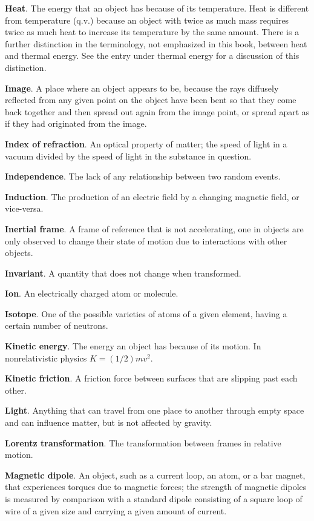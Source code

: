 \textbf{Heat}. The energy that an object has because of its temperature. Heat is different from temperature
(q.v.) because
an object with twice as much mass requires twice as much heat to increase its temperature by the same
amount. There is a
further distinction in the terminology, not emphasized in this book, between heat and thermal energy. See
the entry
under thermal energy for a discussion of this distinction. 

\textbf{Image}. A place where an object appears to be, because the rays diffusely reflected from any given
point on the object have been bent so that they come back together and then spread out again from the image
point, or spread apart as if they had originated from the image. 

\textbf{Index of refraction}. An optical property of matter; the speed of light in a vacuum divided by the
speed of light in the substance in question. 

\textbf{Independence}. The lack of any relationship between two random events.

\textbf{Induction}. The production of an electric field by a changing magnetic field, or vice-versa. 

\textbf{Inertial frame}. A frame of reference that is not accelerating, one in objects are only observed
to change their state of motion due to interactions with other objects.


\textbf{Invariant}. A quantity that does not change when transformed.

\textbf{Ion}. An electrically charged atom or molecule. 

\textbf{Isotope}. One of the possible varieties of atoms of a given element, having a certain number of
neutrons. 

\textbf{Kinetic energy}. The energy an object has because of its motion. In nonrelativistic
physics $K=(1/2)mv^2$.

\textbf{Kinetic friction}. A friction force between surfaces that are slipping past each other.

\textbf{Light}. Anything that can travel from one place to another through empty space and can influence
matter, but is
not affected by gravity. 

\textbf{Lorentz transformation}. The transformation between frames in relative motion.

\textbf{Magnetic dipole}. An object, such as a current loop, an atom, or a bar magnet, that experiences
torques due to magnetic forces; the strength of magnetic dipoles is measured by comparison with a standard
dipole consisting of a square loop of wire of a given size and carrying a given amount of current. 

